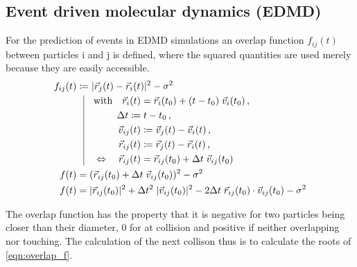 \subsection{Event driven molecular dynamics (EDMD)}
\label{sec:EDMD}
For the prediction of events in EDMD simulations an overlap function $f_{ij}(t)$ between particles i and j is defined, where the squared quantities are used merely because they are easily accessible.\\
\begin{align}
f_{ij}(t) & \coloneqq  | \vec{r}_j(t) - \vec{r}_i(t) |^2 - \sigma^2\\
          & \; \; \, \vrule
  \begin{aligned}[t]
    \quad \text{with} \quad \vec{r}_i(t) &= \vec{r}_i(t_0) + (t-t_0) \; \vec{v}_i(t_0) \, \text{,}\\
    \Delta t \coloneqq & \; t-t_0  \, \text{,} \\ 
    \vec{v}_{ij}(t) &\coloneqq  \vec{v}_j(t) - \vec{v}_i(t) \, \text{,}\\
    \vec{r}_{ij}(t) &\coloneqq  \vec{r}_j(t) - \vec{r}_i(t) \, \text{,}\\
    \Leftrightarrow \quad \vec{r}_{ij}(t) &= \vec{r}_{ij}(t_0) + \Delta t \; \vec{v}_{ij}(t_0)
  \end{aligned}\\
f(t)  & = ( \vec{r}_{ij}(t_0) +  \Delta t \;  \vec{v}_{ij}(t_0))^2 -\sigma^2 \\
\label{eqn:overlap_f}
f(t)  & = |\vec{r}_{ij}(t_0)|^2 + \Delta t ^2 \; |\vec{v}_{ij}(t_0)|^2 - 2 \Delta t \; \vec{r}_{ij}(t_0) \cdot \vec{v}_{ij}(t_0)  -\sigma^2
\end{align}  

The overlap function has the property that it is negative for two particles being closer than their diameter, 0 for at collision and positive if neither overlapping nor touching. The calculation of the next collison thus is to calculate the roots of \autoref{eqn:overlap_f}.\\

